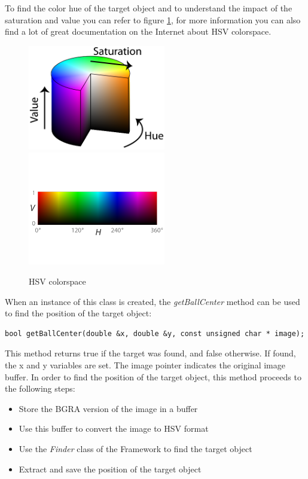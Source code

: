 \documentclass[a4paper, 12pt]{article}  		%
\begin{document}
To find the color hue of the target object and to understand the impact of the saturation and value you can refer to figure \ref{HSV}, for more information you can also find a lot of great documentation on the Internet about HSV colorspace.\\ 
\begin{figure}[H]
\begin{center}
\includegraphics[width=6cm]{HSV.png}
\includegraphics[width=6cm]{HV.png}
\caption{HSV colorspace}
\label{HSV}
\end{center}
\end{figure}

\newpage
When an instance of this class is created, the \textit{getBallCenter} method can be used to find the position of the target object:\\

\lstset{language=c++} 
\lstset{commentstyle=\textit} 
\begin{lstlisting} 
bool getBallCenter(double &x, double &y, const unsigned char * image);
\end{lstlisting}
 
This method returns true if the target was found, and false otherwise. If found, the x and y variables are set. The image pointer indicates the original image buffer. In order to find the position of the target object, this method proceeds to the following steps:\\
\begin{itemize}
\item Store the BGRA version of the image in a buffer
\item Use this buffer to convert the image to HSV format
\item Use the \textit{Finder} class of the Framework to find the target object
\item Extract and save the position of the target object
\end{itemize}
\end{document}
